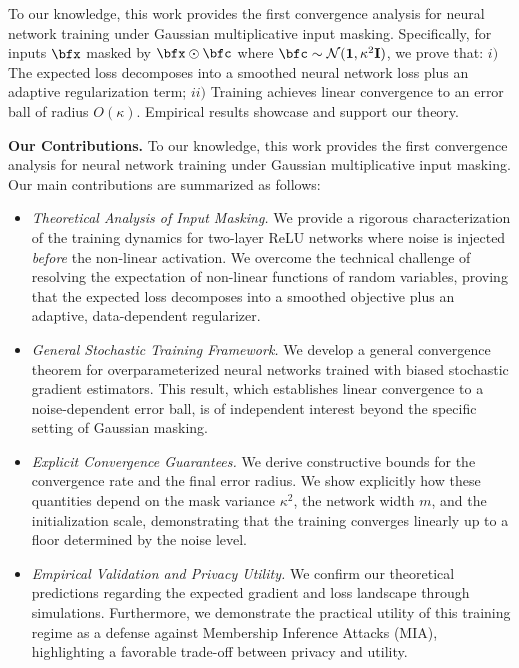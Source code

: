 \documentclass[10pt]{article} %
\theoremstyle{definition}
\theoremstyle{plain}
\begin{document}
To our knowledge, this work provides the first convergence analysis for neural network training under Gaussian multiplicative input masking. 
Specifically, for inputs $\bfx$ masked by $\bfx \odot \bfc$ where $\bfc \sim \mathcal{N}(\mathbf{1}, \kappa^2\mathbf{I})$, we prove that: $i)$ The expected loss decomposes into a smoothed neural network loss plus an adaptive regularization term; $ii)$ Training achieves linear convergence to an error ball of radius $O(\kappa)$. %
Empirical results showcase and support our theory.

\textbf{Our Contributions.}
To our knowledge, this work provides the first convergence analysis for neural network training under Gaussian multiplicative input masking. Our main contributions are summarized as follows:
\begin{itemize}[leftmargin=*]
    \item \textit{Theoretical Analysis of Input Masking.} We provide a rigorous characterization of the training dynamics for two-layer ReLU networks where noise is injected \textit{before} the non-linear activation. We overcome the technical challenge of resolving the expectation of non-linear functions of random variables, proving that the expected loss decomposes into a smoothed objective plus an adaptive, data-dependent regularizer.
    \item \textit{General Stochastic Training Framework.} We develop a general convergence theorem for overparameterized neural networks trained with biased stochastic gradient estimators. This result, which establishes linear convergence to a noise-dependent error ball, is of independent interest beyond the specific setting of Gaussian masking.
    \item \textit{Explicit Convergence Guarantees.} We derive constructive bounds for the convergence rate and the final error radius. We show explicitly how these quantities depend on the mask variance $\kappa^2$, the network width $m$, and the initialization scale, demonstrating that the training converges linearly up to a floor determined by the noise level.
    \item \textit{Empirical Validation and Privacy Utility.} We confirm our theoretical predictions regarding the expected gradient and loss landscape through simulations. Furthermore, we demonstrate the practical utility of this training regime as a defense against Membership Inference Attacks (MIA), highlighting a favorable trade-off between privacy and utility.
\end{itemize}
\end{document}
